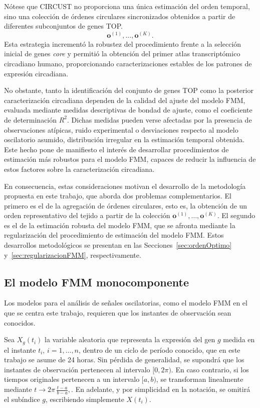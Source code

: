 \documentclass[12pt, a4paper]{report}
\begin{document}
Nótese que CIRCUST no proporciona una única estimación del orden temporal, sino una colección de órdenes circulares sincronizados obtenidos a partir de diferentes subconjuntos de genes TOP.
\[
\mathbf{o}^{(1)},\ldots,\mathbf{o}^{(K)}.
\]
Esta estrategia incrementó la robustez del procedimiento frente a la selección inicial de genes \textit{core} y permitió la obtención del primer atlas transcriptómico circadiano humano, proporcionando caracterizaciones estables de los patrones de expresión circadiana.

No obstante, tanto la identificación del conjunto de genes TOP como la posterior caracterización circadiana dependen de la calidad del ajuste del modelo FMM, evaluada mediante medidas descriptivas de bondad de ajuste, como el coeficiente de determinación \(R^2\). Dichas medidas pueden verse afectadas por la presencia de observaciones atípicas, ruido experimental o desviaciones respecto al modelo oscilatorio asumido, distribución irregular en la estimación temporal obtenida. Este hecho pone de manifiesto el interés de desarrollar procedimientos de estimación más robustos para el modelo FMM, capaces de reducir la influencia de estos factores sobre la caracterización circadiana. 

En consecuencia, estas consideraciones motivan el desarrollo de la metodología propuesta en este trabajo, que aborda dos problemas complementarios. El primero es el de la agregación de órdenes circulares, esto es, la obtención de un orden representativo del tejido a partir de la colección \(\mathbf{o}^{(1)},\ldots,\mathbf{o}^{(K)}\). El segundo es el de la estimación robusta del modelo FMM, que se afronta mediante la regularización del procedimiento de estimación del modelo FMM. Estos desarrollos metodológicos se presentan en las Secciones~\ref{sec:ordenOptimo} y~\ref{sec:regularizacionFMM}, respectivamente.


\subsection{El modelo FMM monocomponente}
\label{sec:modeloFMM}


Los modelos para el análisis de señales oscilatorias, como el modelo FMM en el que se centra este trabajo, requieren que los instantes de observación sean conocidos.

Sea \(X_g(t_i)\) la variable aleatoria que representa la expresión del gen \(g\) medida en el instante \(t_i\), \(i=1,\ldots,n\), dentro de un ciclo de período conocido, que en este trabajo se asume de 24 horas. Sin pérdida de generalidad, se supondrá que los instantes de observación pertenecen al intervalo \([0,2\pi)\). En caso contrario, si los tiempos originales pertenecen a un intervalo \([a,b)\), se transforman linealmente mediante
\(
t\rightarrow 2\pi\,\frac{t-a}{b-a},
\). En adelante, y por simplicidad en la notación, se omitirá el subíndice \(g\), escribiendo simplemente \(X(t_i)\).
\end{document}
